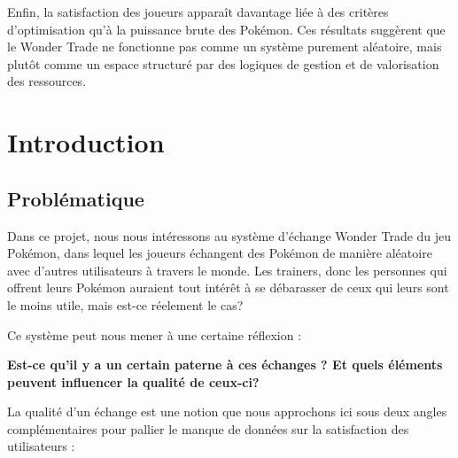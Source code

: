 \documentclass[mstat,12pt]{unswthesis}
\begin{document}
{\medskip}

Enfin, la satisfaction des joueurs apparaît davantage liée à des critères d'optimisation qu'à la puissance brute des Pokémon. Ces résultats suggèrent que le Wonder Trade ne fonctionne pas comme un système purement aléatoire, mais plutôt comme un espace structuré par des logiques de gestion et de valorisation des ressources.






\afterpreface





%
%






\chapter{Introduction}\label{introduction}

\section{Problématique}\label{probluxe9matique}

Dans ce projet, nous nous intéressons au système d'échange Wonder Trade
du jeu Pokémon, dans lequel les joueurs échangent des Pokémon de manière
aléatoire avec d'autres utilisateurs à travers le monde. Les trainers,
donc les personnes qui offrent leurs Pokémon auraient tout intérêt à se
débarasser de ceux qui leurs sont le moins utile, mais est-ce réelement
le cas?

Ce système peut nous mener à une certaine réflexion :

\bigskip

\textbf{Est-ce qu'il y a un certain paterne à ces échanges ? Et quels
éléments peuvent influencer la qualité de ceux-ci?}

\bigskip

La qualité d'un échange est une notion que nous approchons ici sous deux
angles complémentaires pour pallier le manque de données sur la
satisfaction des utilisateurs :\\
\bigskip
\end{document}
